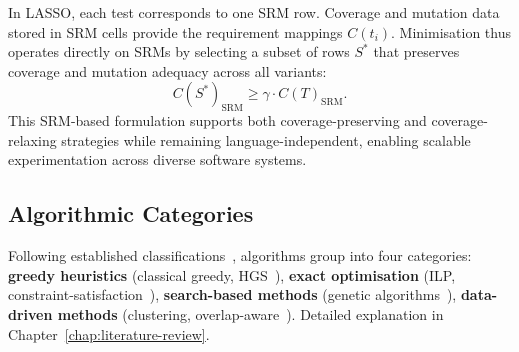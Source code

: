 In LASSO, each test corresponds to one SRM row.  
Coverage and mutation data stored in SRM cells provide the requirement mappings \(C(t_i)\).  
Minimisation thus operates directly on SRMs by selecting a subset of rows \(S^*\) that preserves coverage and mutation adequacy across all variants:
\[
C(S^*)_{\text{SRM}} \ge \gamma \cdot C(T)_{\text{SRM}}.
\]
This SRM-based formulation supports both coverage-preserving and coverage-relaxing strategies while remaining language-independent, enabling scalable experimentation across diverse software systems.


\subsection{Algorithmic Categories}

Following established classifications~\cite{yoo2012,khan2020,bach2017}, algorithms group into four categories: \textbf{greedy heuristics} (classical greedy, HGS~\cite{harrold1993}), \textbf{exact optimisation} (ILP, constraint-satisfaction~\cite{mongiovi2020}), \textbf{search-based methods} (genetic algorithms~\cite{yoo2012}), \textbf{data-driven methods} (clustering, overlap-aware~\cite{bach2017}). Detailed explanation in Chapter~\ref{chap:literature-review}.

